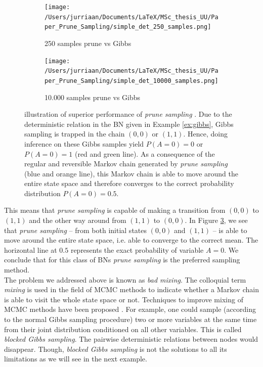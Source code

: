 \documentclass[a4paper, twoside, 11pt]{report}
\theoremstyle{plain}
\theoremstyle{definition}
\theoremstyle{remark}
\newcommand{\ps}{\textit{prune sampling }}
\begin{document}
\begin{figure}[t]
\centering
\begin{subfigure}{.49\textwidth}
  \centering
  \texttt{[image: /Users/jurriaan/Documents/LaTeX/MSc\_thesis\_UU/Paper\_Prune\_Sampling/simple\_det\_250\_samples.png]}
  \caption{250 samples prune vs Gibbs}
  \label{fig:sub1}
\end{subfigure}
\begin{subfigure}{.49\textwidth}
  \centering
  \texttt{[image: /Users/jurriaan/Documents/LaTeX/MSc\_thesis\_UU/Paper\_Prune\_Sampling/simple\_det\_10000\_samples.png]}
  \caption{10.000 samples prune vs Gibbs}
  \label{fig:sub2}
\end{subfigure}
\caption{illustration of superior performance of \ps. Due to the deterministic relation in the BN given in Example \ref{ex:gibbs}, Gibbs sampling is trapped in the chain $(0,0)$ or $(1,1)$. Hence, doing inference on these Gibbs samples yield $P(A = 0)=0$ or $P(A = 0)=1$ (red and green line). As a consequence of the regular and reversible Markov chain generated by \ps (blue and orange line), this Markov chain is able to move around the entire state space and therefore converges to the correct probability distribution $P(A = 0) = 0.5$.}
\label{simple-deterministic}
\end{figure}
This means that \ps is capable of making a transition from $(0,0)$ to $(1,1)$ and the other way around from $(1,1)$ to $(0,0)$. In Figure \ref{simple-deterministic}, we see that \ps -- from both initial states $(0,0)$ and $(1,1)$ -- is able to move around the entire state space, i.e. able to converge to the correct mean. The horizontal line at $0.5$ represents the exact probability of variable $A=0$. We conclude that for this class of BNs \ps is the preferred sampling method.\\

The problem we addressed above is known as \textit{bad mixing}. The colloquial term \textit{mixing} is used in the field of MCMC methods to indicate whether a Markov chain is able to visit the whole state space or not. Techniques to improve mixing of MCMC methods have been proposed \cite{besag1993spatial, brooks2011handbook, gilks1996interdisciplinary}. For example, one could sample (according to the normal Gibbs sampling procedure) two or more variables at the same time from their joint distribution conditioned on all other variables. This is called \textit{blocked Gibbs sampling}. The pairwise deterministic relations between nodes would disappear. Though, \textit{blocked Gibbs sampling} is not the solutions to all its limitations as we will see in the next example.
\end{document}
